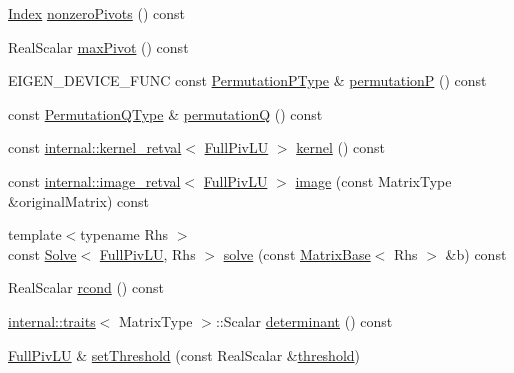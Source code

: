 \begin{DoxyCompactItemize}
\hyperlink{group___core___module_a554f30542cc2316add4b1ea0a492ff02}{Index} \hyperlink{group___l_u___module_aa71132a751ad3c78178e33d6b2987400}{nonzero\+Pivots} () const
\item 
Real\+Scalar \hyperlink{group___l_u___module_abced9f280f5fc49c2e62605c782b237b}{max\+Pivot} () const
\item 
E\+I\+G\+E\+N\+\_\+\+D\+E\+V\+I\+C\+E\+\_\+\+F\+U\+NC const \hyperlink{group___core___module}{Permutation\+P\+Type} \& \hyperlink{group___l_u___module_a09274c82240f6441af5e6c99e24e756d}{permutationP} () const
\item 
const \hyperlink{group___core___module}{Permutation\+Q\+Type} \& \hyperlink{group___l_u___module_a8d18190c7618de271cba7293f0493a36}{permutationQ} () const
\item 
const \hyperlink{struct_eigen_1_1internal_1_1kernel__retval}{internal\+::kernel\+\_\+retval}$<$ \hyperlink{group___l_u___module_class_eigen_1_1_full_piv_l_u}{Full\+Piv\+LU} $>$ \hyperlink{group___l_u___module_a70f52eeb2cd07dfbf790fce106fb4015}{kernel} () const
\item 
const \hyperlink{struct_eigen_1_1internal_1_1image__retval}{internal\+::image\+\_\+retval}$<$ \hyperlink{group___l_u___module_class_eigen_1_1_full_piv_l_u}{Full\+Piv\+LU} $>$ \hyperlink{group___l_u___module_a0893985d2dab367baa6e57c6fd0c4956}{image} (const Matrix\+Type \&original\+Matrix) const
\item 
{\footnotesize template$<$typename Rhs $>$ }\\const \hyperlink{group___core___module_class_eigen_1_1_solve}{Solve}$<$ \hyperlink{group___l_u___module_class_eigen_1_1_full_piv_l_u}{Full\+Piv\+LU}, Rhs $>$ \hyperlink{group___l_u___module_af563471f6f3283fd10779ef02dd0b748}{solve} (const \hyperlink{group___core___module_class_eigen_1_1_matrix_base}{Matrix\+Base}$<$ Rhs $>$ \&b) const
\item 
Real\+Scalar \hyperlink{group___l_u___module_a0bc63f910960dc3e35acecc8442025b6}{rcond} () const
\item 
\hyperlink{struct_eigen_1_1internal_1_1traits}{internal\+::traits}$<$ Matrix\+Type $>$\+::Scalar \hyperlink{group___l_u___module_a71654e5c60a26407ecccfaa5b34bb0aa}{determinant} () const
\item 
\hyperlink{group___l_u___module_class_eigen_1_1_full_piv_l_u}{Full\+Piv\+LU} \& \hyperlink{group___l_u___module_a414592d82de98f5bd075965caf56d681}{set\+Threshold} (const Real\+Scalar \&\hyperlink{group___l_u___module_ad77539203694f2d85ff7d11616e5a0a5}{threshold})
\item 

\end{DoxyCompactItemize}
